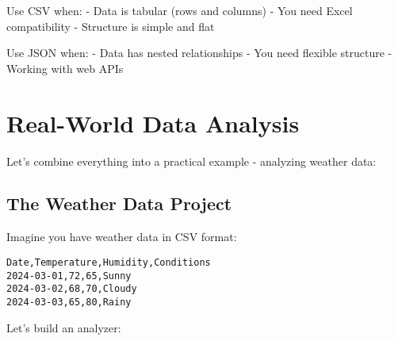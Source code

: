 \documentclass[
  letterpaper,
  DIV=11,
  numbers=noendperiod,
  oneside]{scrreprt}
\begin{document}
Use CSV when: - Data is tabular (rows and columns) - You need Excel
compatibility - Structure is simple and flat

Use JSON when: - Data has nested relationships - You need flexible
structure - Working with web APIs

\section{Real-World Data Analysis}\label{real-world-data-analysis}

Let's combine everything into a practical example - analyzing weather
data:

\subsection{The Weather Data Project}\label{the-weather-data-project}

Imagine you have weather data in CSV format:

\begin{verbatim}
Date,Temperature,Humidity,Conditions
2024-03-01,72,65,Sunny
2024-03-02,68,70,Cloudy
2024-03-03,65,80,Rainy
\end{verbatim}

Let's build an analyzer:
\end{document}
